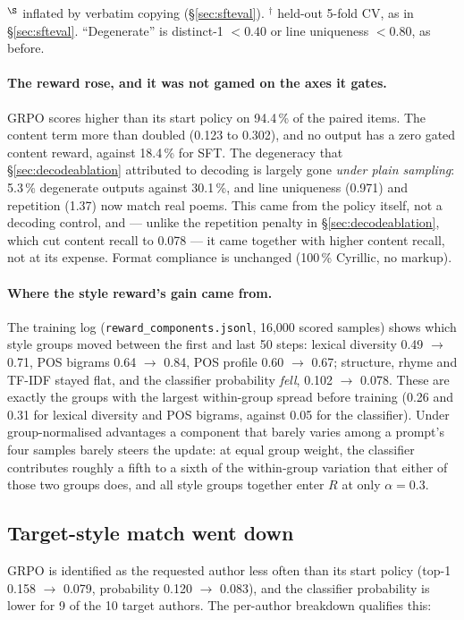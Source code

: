 \documentclass[11pt]{article}
\begin{document}
\noindent
{\footnotesize $^\S$ inflated by verbatim copying (\S\ref{sec:sfteval}).
$^\dagger$ held-out 5-fold CV, as in \S\ref{sec:sfteval}. ``Degenerate'' is
distinct-1 $< 0.40$ or line uniqueness $< 0.80$, as before.}

\paragraph{The reward rose, and it was not gamed on the axes it gates.} GRPO
scores higher than its start policy on 94.4\,\% of the paired items. The
content term more than doubled (0.123 to 0.302), and no output has a zero
gated content reward, against 18.4\,\% for SFT. The degeneracy that
\S\ref{sec:decodeablation} attributed to decoding is largely gone
\emph{under plain sampling}: 5.3\,\% degenerate outputs against 30.1\,\%, and
line uniqueness (0.971) and repetition (1.37) now match real poems. This came
from the policy itself, not a decoding control, and --- unlike the repetition
penalty in \S\ref{sec:decodeablation}, which cut content recall to 0.078 ---
it came together with higher content recall, not at its expense. Format
compliance is unchanged (100\,\% Cyrillic, no markup).

\paragraph{Where the style reward's gain came from.} The training log
(\texttt{reward\_components.jsonl}, 16{,}000 scored samples) shows which
style groups moved between the first and last 50 steps: lexical diversity
0.49 $\to$ 0.71, POS bigrams 0.64 $\to$ 0.84, POS profile 0.60 $\to$ 0.67;
structure, rhyme and TF-IDF stayed flat, and the classifier probability
\emph{fell}, 0.102 $\to$ 0.078. These are exactly the groups with the largest
within-group spread before training (0.26 and 0.31 for lexical diversity and
POS bigrams, against 0.05 for the classifier). Under group-normalised
advantages a component that barely varies among a prompt's four samples
barely steers the update: at equal group weight, the classifier contributes
roughly a fifth to a sixth of the within-group variation that either of
those two groups does, and all style groups together enter $R$ at only
$\alpha=0.3$.

\subsection{Target-style match went down}

GRPO is identified as the requested author less often than its start policy
(top-1 0.158 $\to$ 0.079, probability 0.120 $\to$ 0.083), and the
classifier probability is lower for 9 of the 10 target authors. The per-author
breakdown qualifies this:
\end{document}
